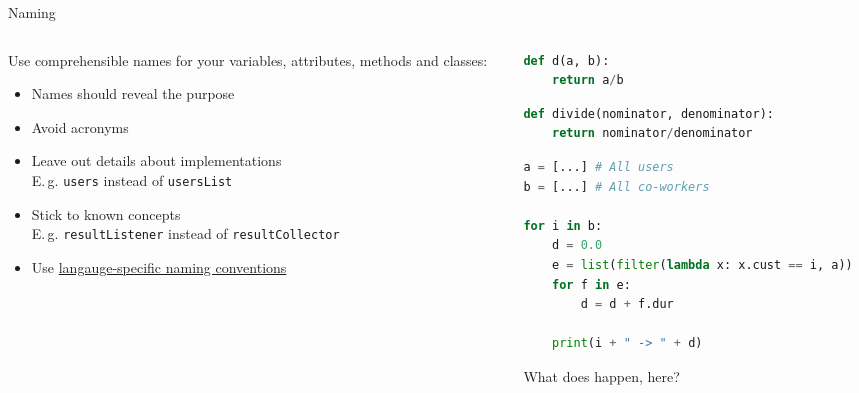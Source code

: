 \documentclass[aspectratio=1610, 9pt]{beamer}
\begin{document}
\begin{frame}[fragile]{Naming}
    \begin{columns}
        \begin{column}{0.5\textwidth}
            \setlength{\parskip}{12pt}%
            
            Use comprehensible names for your variables, attributes, methods and classes:
            
            \begin{itemize}
                \item Names should reveal the purpose
                \item Avoid acronyms
                \item Leave out details about implementations\\E.\,{}g. \lstinline{users} instead of \lstinline{usersList}
                \item Stick to known concepts\\E.\,{}g. \lstinline{resultListener} instead of \lstinline{resultCollector}
                \item Use \href{https://en.wikipedia.org/wiki/Naming_convention_(programming)}{langauge-specific naming conventions}
            \end{itemize}
        \end{column}
        \begin{column}{0.5\textwidth}
            \setlength{\parskip}{6pt}%

            \begin{lstlisting}[language = Python]
def d(a, b):
    return a/b
            \end{lstlisting}

            \begin{lstlisting}[language = Python]
def divide(nominator, denominator):
    return nominator/denominator
            \end{lstlisting}

            \begin{lstlisting}[language = Python]
a = [...] # All users
b = [...] # All co-workers

for i in b:
    d = 0.0
    e = list(filter(lambda x: x.cust == i, a))
    for f in e:
        d = d + f.dur
    
    print(i + " -> " + d)
            \end{lstlisting}
            What does happen, here?
        \end{column}
    \end{columns}
\end{frame}
\end{document}
